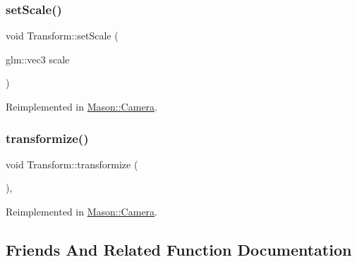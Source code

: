 \hypertarget{class_mason_1_1_transform_a4a273ac58f45b6ee9cf2b37cf661daac}{}\label{class_mason_1_1_transform_a4a273ac58f45b6ee9cf2b37cf661daac} 
\subsubsection{\texorpdfstring{set\+Scale()}{setScale()}}
{\footnotesize\ttfamily void Transform\+::set\+Scale (\begin{DoxyParamCaption}\item[{glm\+::vec3}]{scale }\end{DoxyParamCaption})\hspace{0.3cm}{\ttfamily [virtual]}}



Reimplemented in \hyperlink{class_mason_1_1_camera_a732501ee31e862f557bbbc8ff58631a4}{Mason\+::\+Camera}.

\hypertarget{class_mason_1_1_transform_a4dd61568d49044377f3312397ffdafd1}{}\label{class_mason_1_1_transform_a4dd61568d49044377f3312397ffdafd1} 
\subsubsection{\texorpdfstring{transformize()}{transformize()}}
{\footnotesize\ttfamily void Transform\+::transformize (\begin{DoxyParamCaption}{ }\end{DoxyParamCaption})\hspace{0.3cm}{\ttfamily [protected]}, {\ttfamily [virtual]}}



Reimplemented in \hyperlink{class_mason_1_1_camera_a27ff2d3ad004a49db2ae508ac6e9d3c2}{Mason\+::\+Camera}.



\subsection{Friends And Related Function Documentation}
\hypertarget{class_mason_1_1_transform_a00df87c957d8f7ee0fc51f07a0542f4a}{}\label{class_mason_1_1_transform_a00df87c957d8f7ee0fc51f07a0542f4a} 
